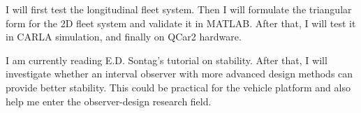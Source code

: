 \documentclass[11pt,a4paper]{article}
\begin{document}
I will first test the longitudinal fleet system. Then I will formulate the triangular form for the 2D fleet system and validate it in MATLAB. After that, I will test it in CARLA simulation, and finally on QCar2 hardware.

I am currently reading E.D. Sontag’s tutorial on stability. After that, I will investigate whether an interval observer with more advanced design methods can provide better stability. This could be practical for the vehicle platform and also help me enter the observer-design research field.
\end{document}
